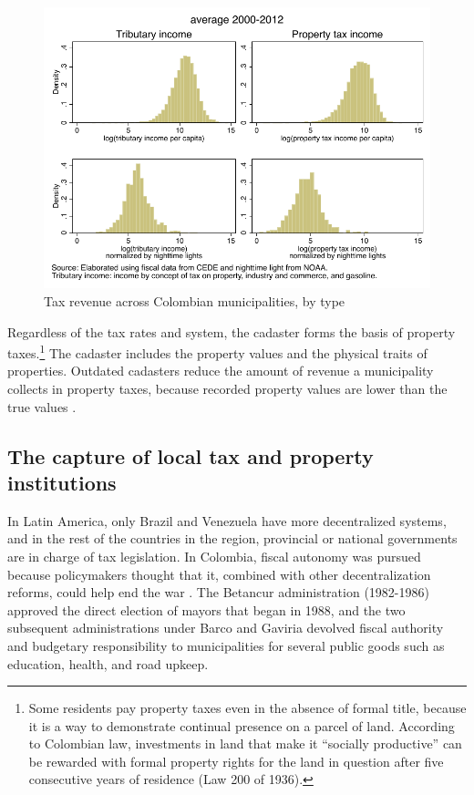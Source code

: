\begin{figure}[H]
\begin{center}
\caption{Tax revenue across Colombian municipalities, by type}
\label{chapter3_fig:distributionrevenues}
\includegraphics[width=1\textwidth]{Chapter3/Figures/figure2.pdf}
\end{center}
\end{figure}

Regardless of the tax rates and system, the cadaster forms the basis of property taxes.\footnote{Some residents pay property taxes even in the absence of formal title, because it is a way to demonstrate continual presence on a parcel of land. According to Colombian law, investments in land that make it ``socially productive'' can be rewarded with formal property rights for the land in question after five consecutive years of residence (Law 200 of 1936).} The cadaster includes the property values and the physical traits of properties. Outdated cadasters reduce the amount of revenue a municipality collects in property taxes, because recorded property values are lower than the true values \citep{iregui-b.b.04a}. 

\subsection{The capture of local tax and property institutions}

In Latin America, only Brazil and Venezuela have more decentralized systems, and in the rest of the countries in the region, provincial or national governments are in charge of tax legislation. In Colombia, fiscal autonomy was pursued because policymakers thought that it, combined with other decentralization reforms, could help end the war \citep[534, 541]{eaton06a}. The Betancur administration (1982-1986) approved the direct election of mayors that began in 1988, and the two subsequent administrations under Barco and Gaviria devolved fiscal authority and budgetary responsibility to municipalities for several public goods such as education, health, and road upkeep. 

